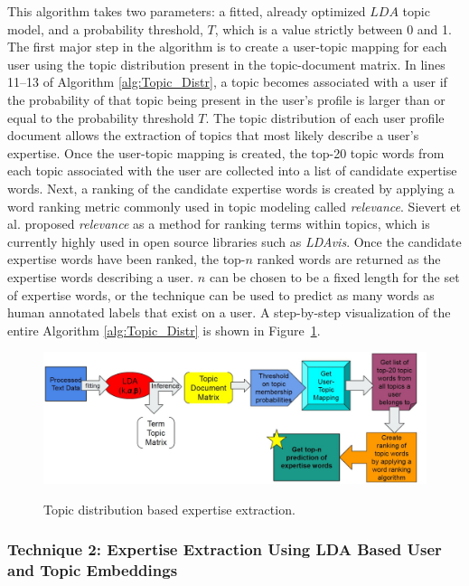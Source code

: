             This algorithm takes two parameters: a fitted, already optimized $LDA$ topic model, and a probability threshold, $T$, which is a value strictly between 0 and 1. The first major step in the algorithm is to create a user-topic mapping for each user using the topic distribution present in the topic-document matrix. In lines 11--13 of Algorithm \ref{alg:Topic_Distr}, a topic becomes associated with a user if the probability of that topic being present in the user's profile is larger than or equal to the probability threshold $T$. The topic distribution of each user profile document allows the extraction of topics that most likely describe a user's expertise. Once the user-topic mapping is created, the top-20 topic words from each topic associated with the user are collected into a list of candidate expertise words. Next, a ranking of the candidate expertise words is created by applying a word ranking metric commonly used in topic modeling called \emph{relevance}. Sievert et al. \cite{sievert2014ldavis} proposed \emph{relevance} as a method for ranking terms within topics, which is currently highly used in open source libraries such as \textit{LDAvis}. Once the candidate expertise words have been ranked, the top-$n$ ranked words are returned as the expertise words describing a user. $n$ can be chosen to be a fixed length for the set of expertise words, or the technique can be used to predict as many words as human annotated labels that exist on a user. A step-by-step visualization of the entire Algorithm \ref{alg:Topic_Distr} is shown in Figure~\ref{fig:technique1}.
            
            \begin{figure}[!ht]
              \centering
              \includegraphics[width=\textwidth]{figures/technique1.JPG}\\
              \caption{Topic distribution based expertise extraction.}
              \label{fig:technique1}
            \end{figure}
            
        \subsubsection{Technique 2: Expertise Extraction Using LDA Based User and Topic Embeddings}
        
